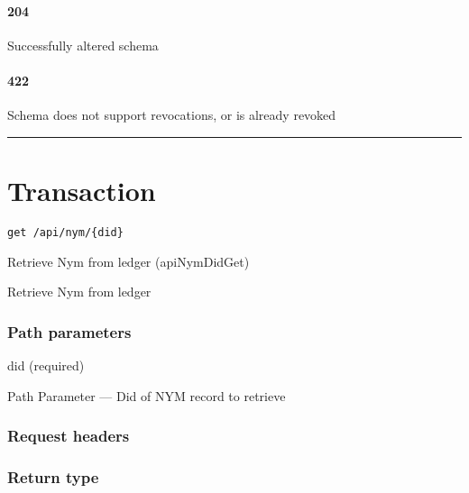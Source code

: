 \hypertarget{section-466}{%
\paragraph{204}\label{section-466}}

Successfully altered schema \protect\hyperlink{}{}

\hypertarget{section-467}{%
\paragraph{422}\label{section-467}}

Schema does not support revocations, or is already revoked
\protect\hyperlink{}{}

\begin{center}\rule{0.5\linewidth}{\linethickness}\end{center}

\hypertarget{transaction-1}{%
\section{\texorpdfstring{\protect\hypertarget{Transaction}{}{Transaction}}{Transaction}}\label{transaction-1}}

\protect\hypertarget{apiNymDidGet}{}{}

\begin{verbatim}
get /api/nym/{did}
\end{verbatim}

Retrieve Nym from ledger ({apiNymDidGet})

Retrieve Nym from ledger

\hypertarget{path-parameters-79}{%
\subsubsection{Path parameters}\label{path-parameters-79}}

did (required)

{Path Parameter} --- Did of NYM record to retrieve

\hypertarget{request-headers-78}{%
\subsubsection{Request headers}\label{request-headers-78}}

\hypertarget{return-type-110}{%
\subsubsection{Return type}\label{return-type-110}}

